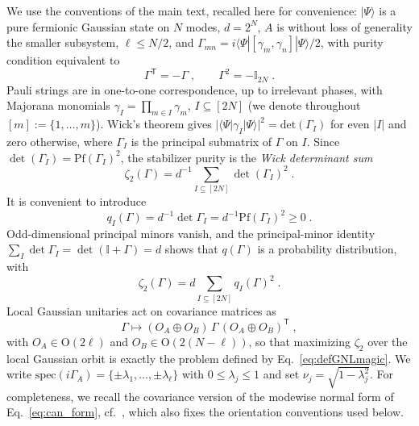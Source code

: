 \documentclass[prx,twocolumn,superscriptaddress,aps,10pt, frontmatterverbose, reprint,footinbib,longbibliography=true]{revtex4-2}
\newcommand{\trans}{\mathsf{T}}
\begin{document}
We use the conventions of the main text, recalled here for convenience: $|\Psi\rangle$ is a pure fermionic Gaussian state on $N$ modes, $d=2^N$, $A$ is without loss of generality the smaller subsystem, $\ell\le N/2$,  and $\Gamma_{mn}=i\langle\Psi|[\gamma_m,\gamma_n]|\Psi\rangle/2$, with purity condition equivalent to
\begin{equation}
    \Gamma^{\trans}=-\Gamma\;,\qquad \Gamma^2=-\mathbb{I}_{2N}\;.
    \label{eq:pure-covariance}
\end{equation}
Pauli strings are in one-to-one correspondence, up to irrelevant phases, with Majorana monomials $\gamma_I=\prod_{m\in I}\gamma_m$, $I\subseteq[2N]$ (we denote throughout $[m]:=\{1,\dots,m\}$). Wick's theorem gives $|\langle\Psi|\gamma_I|\Psi\rangle|^2=\mathrm{det}(\Gamma_I)$ for even $|I|$ and zero otherwise, where $\Gamma_I$ is the principal submatrix of $\Gamma$ on $I$. Since $\det(\Gamma_I)=\mathrm{Pf}(\Gamma_I)^2$, the stabilizer purity is the \emph{Wick determinant sum}
\begin{equation}
    \zeta_2(\Gamma)=d^{-1}\sum_{I\subseteq[2N]}\det(\Gamma_I)^2\;.
    \label{eq:zeta-M}
\end{equation}
It is convenient to introduce
\begin{equation}
    q_I(\Gamma)=d^{-1}\det\Gamma_I=d^{-1}\mathrm{Pf}(\Gamma_I)^2\ge 0\;.
    \label{eq:q-definition}
\end{equation}
Odd-dimensional principal minors vanish, and the principal-minor identity $\sum_I\det\Gamma_I=\det(\mathbb{I}+\Gamma)=d$ shows that $q(\Gamma)$ is a probability distribution, with
\begin{equation}
    \zeta_2(\Gamma)=d\sum_{I\subseteq[2N]} q_I(\Gamma)^2\;.
    \label{eq:q-collision}
\end{equation}
Local Gaussian unitaries act on covariance matrices as
\begin{equation}
    \Gamma\longmapsto (O_A\oplus O_B)\,\Gamma\,(O_A\oplus O_B)^{\trans}\;,
    \label{eq:local-action}
\end{equation}
with $O_A\in\mathrm{O}(2\ell)$ and $O_B\in\mathrm{O}(2(N-\ell))$, so that maximizing $\zeta_2$ over the local Gaussian orbit is exactly the problem defined by Eq.~\eqref{eq:defGNLmagic}.
 We write $\mathrm{spec}(i\Gamma_A)=\{\pm\lambda_1,\dots,\pm\lambda_\ell\}$ with $0\le\lambda_j\le 1$ and set $\nu_j=\sqrt{1-\lambda_j^2}$.
For completeness, we recall the covariance version of the modewise normal form of Eq.~\eqref{eq:can_form}, cf.~\cite{BoteroReznik2004}, which also fixes the orientation conventions used below. 
\end{document}
